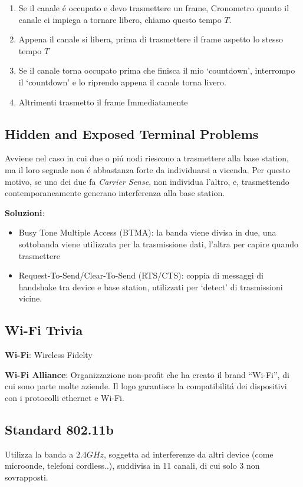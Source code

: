\documentclass{article}
\begin{document}
\begin{enumerate}
    \item Se il canale \'e occupato e devo trasmettere un frame, Cronometro quanto il canale ci impiega a tornare libero, chiamo questo tempo $T$.
    \item Appena il canale si libera, prima di trasmettere il frame aspetto lo stesso tempo $T$
    \item Se il canale torna occupato prima che finisca il mio `countdown', interrompo il `countdown' e lo riprendo appena il canale torna livero.
    \item Altrimenti trasmetto il frame Immediatamente
\end{enumerate}


\subsection{Hidden and Exposed Terminal Problems}
Avviene nel caso in cui due o pi\'u nodi riescono a trasmettere alla base station, ma il loro segnale non \'e abbastanza forte da individuarsi a vicenda.
Per questo motivo, se uno dei due fa \textit{Carrier Sense}, non individua l'altro, e, trasmettendo contemporaneamente generano interferenza alla base station.

\textbf{Soluzioni}:
\begin{itemize}
    \item Busy Tone Multiple Access (BTMA): la banda viene divisa in due, una sottobanda viene utilizzata per la trasmissione dati, l'altra per capire quando trasmettere
    \item Request-To-Send/Clear-To-Send (RTS/CTS): coppia di messaggi di handshake tra device e base station, utilizzati per `detect' di trasmissioni vicine.
\end{itemize}


\subsection{Wi-Fi Trivia}
\textbf{Wi-Fi}: Wireless Fidelty

\textbf{Wi-Fi Alliance}: Organizzazione non-profit che ha creato il brand ``Wi-Fi'', di cui sono parte molte aziende. Il logo garantisce la compatibilit\'a dei dispositivi con i protocolli ethernet e Wi-Fi.


\subsection{Standard 802.11b}
Utilizza la banda a $2.4 GHz$, soggetta ad interferenze da altri device (come microonde, telefoni cordless..), suddivisa in 11 canali, di cui solo 3 non sovrapposti.
\end{document}
